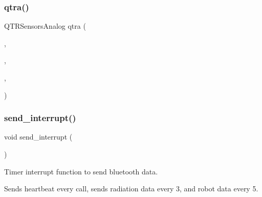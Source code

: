 \mbox{\label{rbe2001_8ino_aba1edf1920db9237b941ca0f77abbaae}} 
\subsubsection{\texorpdfstring{qtra()}{qtra()}}
{\footnotesize\ttfamily Q\+T\+R\+Sensors\+Analog qtra (\begin{DoxyParamCaption}\item[{(unsigned char\mbox{[}$\,$\mbox{]}) \{\hyperlink{config_8h_a78fa539ebb20148cbfcad00742561cf6}{Q\+T\+R\+\_\+1}, \hyperlink{config_8h_a49fbc5f0ba729444355eb9ce3588aa40}{Q\+T\+R\+\_\+2}, \hyperlink{config_8h_ae5dcb2e48b67f90a48eddc8d7f1b44ea}{Q\+T\+R\+\_\+3}, \hyperlink{config_8h_a1e52ef437d8700013af2088d388a1cf3}{Q\+T\+R\+\_\+4}, \hyperlink{config_8h_ad90df5df0b2368d826186652cfbe236a}{Q\+T\+R\+\_\+5}, \hyperlink{config_8h_ab683ec86911bbd120c0623b121046420}{Q\+T\+R\+\_\+6}, \hyperlink{config_8h_a5b8ce3aa53de77253e04c5d0eecf97db}{Q\+T\+R\+\_\+7}, \hyperlink{config_8h_a6eef11bb690916992e7933e0ae8e2047}{Q\+T\+R\+\_\+8}\}}]{,  }\item[{\hyperlink{config_8h_a3564cf3b48686cd6404dd989384a56c4}{Q\+T\+R\+\_\+\+S\+E\+N\+S\+O\+R\+\_\+\+C\+O\+U\+NT}}]{,  }\item[{4}]{,  }\item[{\hyperlink{config_8h_a76643b2e251e861bc3a68e1a70d3e795}{Q\+T\+R\+\_\+\+L\+E\+D\+\_\+\+ON}}]{ }\end{DoxyParamCaption})}

\mbox{\label{rbe2001_8ino_acb02cd64de9dd91936bfd24d9e1ca769}} 
\subsubsection{\texorpdfstring{send\+\_\+interrupt()}{send\_interrupt()}}
{\footnotesize\ttfamily void send\+\_\+interrupt (\begin{DoxyParamCaption}{ }\end{DoxyParamCaption})}



Timer interrupt function to send bluetooth data. 

Sends heartbeat every call, sends radiation data every 3, and robot data every 5. 

